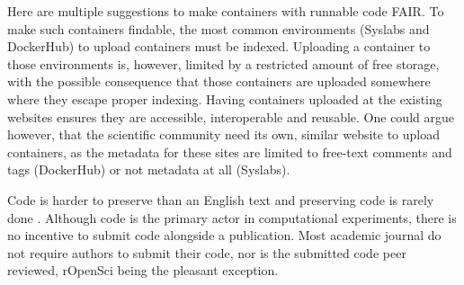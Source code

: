 Here are multiple suggestions to make containers with runnable code FAIR.
To make such containers findable, the most common 
environments (Syslabs and DockerHub) to upload containers must be indexed.
Uploading a container to those environments is, however, limited by
a restricted amount of free storage, with the possible consequence that
those containers are uploaded somewhere where they escape proper indexing.
Having containers uploaded at the existing websites ensures they are
accessible, interoperable and reusable.
One could argue however, that the scientific community need its own,
similar website to upload containers, as the metadata for these
sites are limited to free-text comments and tags (DockerHub)
or not metadata at all (Syslabs).

Code is harder to preserve than an English text
and preserving code is rarely done \cite{barnes2010publish}.
Although code is the primary actor in computational experiments,
there is no incentive to submit code alongside a publication.
Most academic journal do not require authors to submit their code,
nor is the submitted code peer reviewed, 
rOpenSci \cite{ram2018community} being the pleasant exception.

